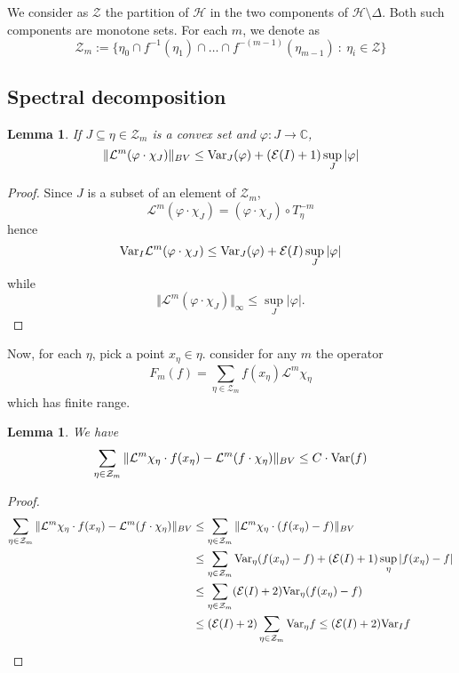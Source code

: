 \documentclass[11pt]{amsart}
\newtheorem{lemma}[theorem]{Lemma}
\newcommand{\var}{\textup{Var}}
\begin{document}
We consider as $\mathcal{Z}$ the partition of $\mathcal{H}$ in the two components of $\mathcal{H} \setminus \Delta$. 
Both such components are monotone sets. For each $m$, we denote as 
$$\mathcal{Z}_m := \{ \eta_0 \cap f^{-1}(\eta_1) \cap \dots \cap f^{-(m-1)}(\eta_{m-1}) \ : \ \eta_i \in \mathcal{Z} \}$$


\subsection{Spectral decomposition}


\begin{lemma}
If $J \subseteq \eta \in \mathcal{Z}_m$ is a convex set and $\varphi : J \to \mathbb{C}$, 
$$\Vert \mathcal{L}^m(\varphi \cdot \chi_J) \Vert_{BV} \leq \var_J( \varphi) + (\mathcal{E}(I) + 1) \sup_J |\varphi|$$
\end{lemma}

\begin{proof}
Since $J$ is a subset of an element of $\mathcal{Z}_m$, 
$$ \mathcal{L}^m(\varphi \cdot \chi_J)  = (\varphi \cdot \chi_J) \circ T_\eta^{-m}$$
hence
$$ \var_I \mathcal{L}^m(\varphi \cdot \chi_J)  \leq \var_J (\varphi) + \mathcal{E}(I) \sup_J |\varphi| $$
while 
$$\Vert \mathcal{L}^m(\varphi \cdot \chi_J) \Vert_\infty \leq \sup_J |\varphi|.$$
\end{proof}


Now, for each $\eta$, pick a point $x_\eta \in \eta$. 
consider for any $m$ the operator 
$$F_m(f) =  \sum_{\eta \in \mathcal{Z}_m} f(x_\eta) \mathcal{L}^m \chi_\eta$$ 
which has finite range. 




\begin{lemma} \label{L:almost-compact}
We have 
$$\sum_{\eta \in \mathcal{Z}_m} \Vert \mathcal{L}^m \chi_\eta \cdot f(x_\eta) - \mathcal{L}^m(f \cdot \chi_\eta)\Vert_{BV} \leq C \cdot \var(f)$$
\end{lemma}

\begin{proof}
\begin{align*}
\sum_{\eta \in \mathcal{Z}_m} \Vert \mathcal{L}^m \chi_\eta \cdot f(x_\eta) - \mathcal{L}^m(f \cdot \chi_\eta)\Vert_{BV} 
& \leq \sum_{\eta \in \mathcal{Z}_m} \Vert \mathcal{L}^m \chi_\eta \cdot (f(x_\eta) - f)\Vert_{BV} \\
& \leq \sum_{\eta \in \mathcal{Z}_m}
\var_\eta (f(x_\eta) - f) + (\mathcal{E}(I) + 1) \sup_\eta |f(x_\eta) - f| \\
& \leq \sum_{\eta \in \mathcal{Z}_m}
(\mathcal{E}(I) + 2) \var_\eta (f(x_\eta) - f) \\
&  \leq (\mathcal{E}(I) + 2)  \sum_{\eta \in \mathcal{Z}_m}
 \var_\eta f \leq (\mathcal{E}(I) + 2)  \var_I f
 \end{align*}
\end{proof}
\end{document}
